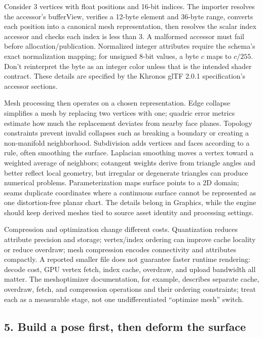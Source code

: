 Consider 3 vertices with float positions and 16-bit indices. The importer resolves the accessor's bufferView, verifies a 12-byte element and 36-byte range, converts each position into a canonical mesh representation, then resolves the scalar index accessor and checks each index is less than 3. A malformed accessor must fail before allocation/publication. Normalized integer attributes require the schema's exact normalization mapping; for unsigned 8-bit values, a byte \(c\) maps to \(c/255\). Don't reinterpret the byte as an integer color unless that is the intended shader contract. These details are specified by the Khronos glTF 2.0.1 specification's accessor sections.

Mesh processing then operates on a chosen representation. Edge collapse simplifies a mesh by replacing two vertices with one; quadric error metrics estimate how much the replacement deviates from nearby face planes. Topology constraints prevent invalid collapses such as breaking a boundary or creating a non-manifold neighborhood. Subdivision adds vertices and faces according to a rule, often smoothing the surface. Laplacian smoothing moves a vertex toward a weighted average of neighbors; cotangent weights derive from triangle angles and better reflect local geometry, but irregular or degenerate triangles can produce numerical problems. Parameterization maps surface points to a 2D domain; seams duplicate coordinates where a continuous surface cannot be represented as one distortion-free planar chart. The details belong in Graphics, while the engine should keep derived meshes tied to source asset identity and processing settings.

Compression and optimization change different costs. Quantization reduces attribute precision and storage; vertex/index ordering can improve cache locality or reduce overdraw; mesh compression encodes connectivity and attributes compactly. A reported smaller file does not guarantee faster runtime rendering: decode cost, GPU vertex fetch, index cache, overdraw, and upload bandwidth all matter. The meshoptimizer documentation, for example, describes separate cache, overdraw, fetch, and compression operations and their ordering constraints; treat each as a measurable stage, not one undifferentiated ``optimize mesh'' switch.

\subsection{5. Build a pose first, then deform the surface}\label{04-visual-computing-ii-ch037-build-a-pose-first-then-deform-the-surface}

